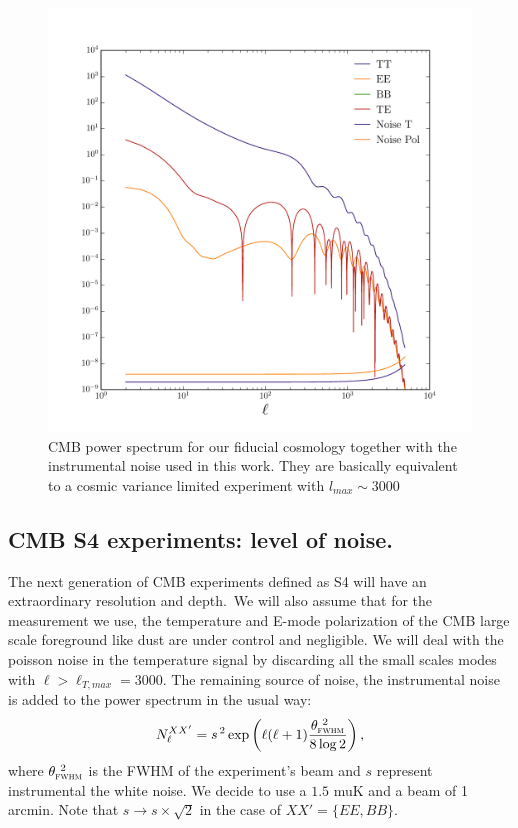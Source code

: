 \documentclass[aps,prd,preprint,groupedaddress]{revtex4-1}
\begin{document}
\begin{figure}[htbp]
\begin{center}
\includegraphics[scale=0.6]{PS_with_noise.pdf}
\caption{CMB power spectrum for our fiducial cosmology together with the instrumental noise used in this work. They are basically equivalent to a cosmic variance limited experiment with $l_{max}\sim 3000$}
\label{fig:cmb-cl-noise}
\end{center}
\end{figure}


\subsection{CMB S4 experiments: level of noise.}

The next generation of CMB experiments defined as S4 will have an extraordinary resolution and depth.\
We will also assume that for the measurement we use, the temperature and E-mode polarization of the CMB large scale foreground like dust are under control and negligible. We will deal with the poisson noise in the temperature signal by discarding all the small scales modes with $\ell>\ell_{T,max}=3000$.
The remaining source of noise, the instrumental noise is added to the power spectrum in the usual way:
 \begin{equation}
 	\centering
		N^{ XX' }_\ell = s^{\, 2} \exp \left(\ell(\ell+1) \frac{\theta^{\ 2}_{\textsc{fwhm}}}{8\log2}\right),
	\label{eq:beamnoise}
\end{equation}
where $\theta^{\ 2}_{\textsc{fwhm}}$ is the FWHM of the experiment's beam and $s$ represent instrumental the white noise.
We decide to use a $1.5$ muK and a beam of 1 arcmin.
Note that  $s \rightarrow s\times \sqrt{2}$ in the case of $ XX' = \{ EE, BB \}$.
\end{document}
